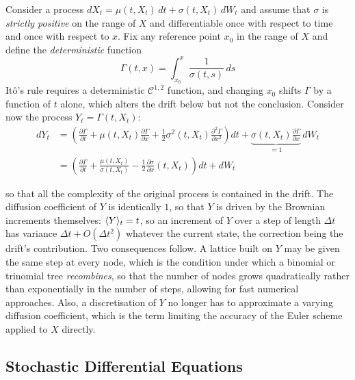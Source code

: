 \begin{example}

     Consider a process  $dX_t = \mu(t,X_t)\, dt + \sigma(t,X_t) \, dW_t$ and assume that $\sigma$ is \emph{strictly positive} on the range of $X$ and differentiable once with respect to time and once with respect to $x$. Fix any reference point $x_0$ in the range of $X$ and define the \emph{deterministic} function 
    \begin{equation}
        \Gamma(t,x) = \int_{x_0}^x \frac{1}{\sigma(t,s)}\, ds
    \end{equation}
 Itô's rule requires a deterministic
$\mathcal{C}^{1,2}$ function, and changing $x_0$ shifts $\Gamma$ by a function of $t$ alone, which
alters the drift below but not the conclusion. Consider now the process $Y_t = \Gamma(t,X_t)$:
\begin{equation}
    \begin{aligned}
        dY_t &= \left( \frac{\partial \Gamma}{\partial t} + \mu(t,X_t)\frac{\partial \Gamma}{\partial x} + \frac{1}{2}\sigma^2(t,X_t)\frac{\partial^2 \Gamma}{\partial x^2} \right) dt + \underbrace{\sigma(t,X_t)\frac{\partial \Gamma}{\partial x}}_{=1} \, dW_t \\
        &= \left( \frac{\partial \Gamma}{\partial t} + \frac{\mu(t,X_t)}{\sigma(t,X_t)} - \frac{1}{2}\frac{\partial \sigma}{\partial x}(t,X_t) \right) dt + dW_t
    \end{aligned}    
\end{equation}




so that all the complexity of the original process is contained in the drift. The diffusion coefficient of $Y$ is identically $1$, so that $Y$ is
driven by the Brownian increments themselves: $\langle Y \rangle_t = t$, so an increment of $Y$ over a step of
length $\Delta t$ has variance $\Delta t + O(\Delta t^2)$ whatever the current state, the correction
being the drift's contribution. Two consequences follow. A lattice built on $Y$ may be given the same
step at every node, which is the condition under which a binomial or trinomial tree
\emph{recombines}, so that the number of nodes grows quadratically rather than exponentially in the
number of steps, allowing for fast numerical approaches. Also, a discretisation of $Y$ no longer has to approximate a varying diffusion
coefficient, which is the term limiting the accuracy of the Euler scheme applied to $X$ directly.
\end{example}

\subsection{Stochastic Differential Equations}\label{subsec:sdes}

